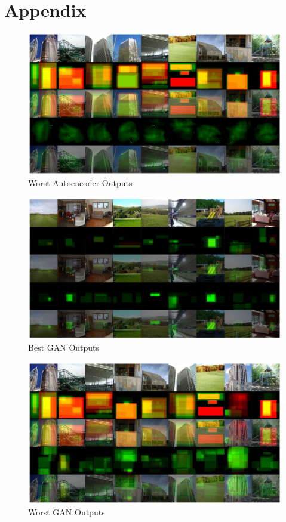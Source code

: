 \documentclass{UoYCSproject}
\begin{document}
\chapter{Appendix}

\begin{figure}[ht]
    \centering
    \includegraphics[width=\linewidth]{Worst autoencoder Outputs}
    \caption{Worst Autoencoder Outputs}
    \label{fig:autoencoderWorstOutput}
\end{figure}

\begin{figure}[ht]
    \centering
    \includegraphics[width=\linewidth]{Best GAN Outputs}
    \caption{Best GAN Outputs}
    \label{fig:GANBestOutput}
\end{figure}

\begin{figure}[ht]
    \centering
    \includegraphics[width=\linewidth]{Worst GAN Outputs}
    \caption{Worst GAN Outputs}
    \label{fig:GANWorstOutput}
\end{figure}
\end{document}
